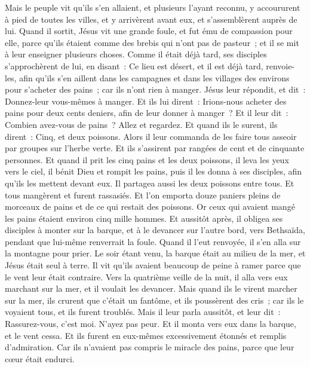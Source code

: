 \begin{multicols}{2}
Mais le peuple vit qu'ils s'en allaient, et plusieurs l'ayant reconnu, y accoururent à pied de toutes les villes, et y arrivèrent avant eux, et s'assemblèrent auprès de lui.
Quand il sortit, Jésus vit une grande foule, et fut ému de compassion pour elle, parce qu'ils étaient comme des brebis qui n'ont pas de pasteur~; et il se mit à leur enseigner plusieurs choses.
Comme il était déjà tard, ses disciples s'approchèrent de lui, en disant~: Ce lieu est désert, et il est déjà tard,
renvoie-les, afin qu'ils s'en aillent dans les campagnes et dans les villages des environs pour s'acheter des pains~; car ils n'ont rien à manger.
Jésus leur répondit, et dit~: Donnez-leur vous-mêmes à manger. Et ils lui dirent~: Irions-nous acheter des pains pour deux cents deniers, afin de leur donner à manger~?
Et il leur dit~: Combien avez-vous de pains~? Allez et regardez. Et quand ils le surent, ils dirent~: Cinq, et deux poissons.
Alors il leur commanda de les faire tous asseoir par groupes sur l'herbe verte.
Et ils s'assirent par rangées de cent et de cinquante personnes.
Et quand il prit les cinq pains et les deux poissons, il leva les yeux vers le ciel, il bénit Dieu et rompit les pains, puis il les donna à ses disciples, afin qu'ils les mettent devant eux. Il partagea aussi les deux poissons entre tous.
Et tous mangèrent et furent rassasiés.
Et l'on emporta douze paniers pleins de morceaux de pains et de ce qui restait des poissons.
Or ceux qui avaient mangé les pains étaient environ cinq mille hommes.
Et aussitôt après, il obligea ses disciples à monter sur la barque, et à le devancer sur l'autre bord, vers Bethsaïda, pendant que lui-même renverrait la foule.
Quand il l'eut renvoyée, il s'en alla sur la montagne pour prier.
Le soir étant venu, la barque était au milieu de la mer, et Jésus était seul à terre.
Il vit qu'ils avaient beaucoup de peine à ramer parce que le vent leur était contraire. Vers la quatrième veille de la nuit, il alla vers eux marchant sur la mer, et il voulait les devancer.
Mais quand ils le virent marcher sur la mer, ils crurent que c'était un fantôme, et ils poussèrent des cris~;
car ils le voyaient tous, et ils furent troublés. Mais il leur parla aussitôt, et leur dit~: Rassurez-vous, c'est moi. N'ayez pas peur.
Et il monta vers eux dans la barque, et le vent cessa. Et ils furent en eux-mêmes excessivement étonnés et remplis d'admiration.
Car ils n'avaient pas compris le miracle des pains, parce que leur cœur était endurci.

\end{multicols}
